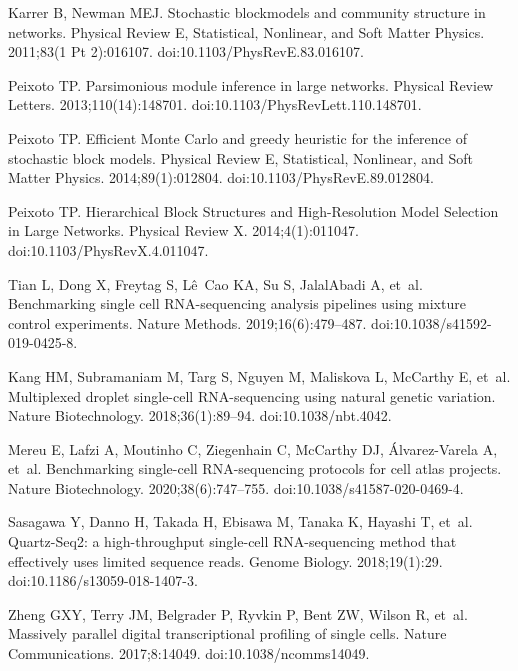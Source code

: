 \documentclass[10pt,letterpaper]{article}
\begin{document}
\begin{thebibliography}{10}
Karrer B, Newman MEJ.
\newblock Stochastic blockmodels and community structure in networks.
\newblock Physical Review E, Statistical, Nonlinear, and Soft Matter Physics.
  2011;83(1 Pt 2):016107.
\newblock doi:{10.1103/{PhysRevE}.83.016107}.

Peixoto TP.
\newblock Parsimonious module inference in large networks.
\newblock Physical Review Letters. 2013;110(14):148701.
\newblock doi:{10.1103/{PhysRevLett}.110.148701}.

Peixoto TP.
\newblock Efficient Monte Carlo and greedy heuristic for the inference of
  stochastic block models.
\newblock Physical Review E, Statistical, Nonlinear, and Soft Matter Physics.
  2014;89(1):012804.
\newblock doi:{10.1103/{PhysRevE}.89.012804}.

Peixoto TP.
\newblock Hierarchical Block Structures and High-Resolution Model Selection in
  Large Networks.
\newblock Physical Review X. 2014;4(1):011047.
\newblock doi:{10.1103/{PhysRevX}.4.011047}.

Tian L, Dong X, Freytag S, Lê~Cao KA, Su S, {JalalAbadi} A, et~al.
\newblock Benchmarking single cell {RNA}-sequencing analysis pipelines using
  mixture control experiments.
\newblock Nature Methods. 2019;16(6):479--487.
\newblock doi:{10.1038/s41592-019-0425-8}.

Kang HM, Subramaniam M, Targ S, Nguyen M, Maliskova L, {McCarthy} E, et~al.
\newblock Multiplexed droplet single-cell {RNA}-sequencing using natural
  genetic variation.
\newblock Nature Biotechnology. 2018;36(1):89--94.
\newblock doi:{10.1038/nbt.4042}.

Mereu E, Lafzi A, Moutinho C, Ziegenhain C, {McCarthy} DJ, {Álvarez-Varela} A,
  et~al.
\newblock Benchmarking single-cell {RNA}-sequencing protocols for cell atlas
  projects.
\newblock Nature Biotechnology. 2020;38(6):747--755.
\newblock doi:{10.1038/s41587-020-0469-4}.

Sasagawa Y, Danno H, Takada H, Ebisawa M, Tanaka K, Hayashi T, et~al.
\newblock Quartz-Seq2: a high-throughput single-cell {RNA}-sequencing method
  that effectively uses limited sequence reads.
\newblock Genome Biology. 2018;19(1):29.
\newblock doi:{10.1186/s13059-018-1407-3}.

Zheng GXY, Terry JM, Belgrader P, Ryvkin P, Bent ZW, Wilson R, et~al.
\newblock Massively parallel digital transcriptional profiling of single cells.
\newblock Nature Communications. 2017;8:14049.
\newblock doi:{10.1038/ncomms14049}.


\end{thebibliography}
\end{document}
